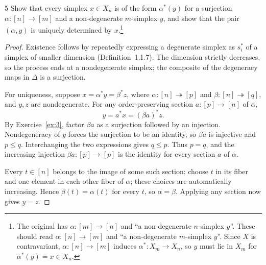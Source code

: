 \begin{exercise}{5}
Show that every simplex $x\in X_n$ is of the form $\alpha^*(y)$ for a
surjection $\alpha\colon[n]\to[m]$ and a non-degenerate $m$-simplex $y$,
and show that the pair $(\alpha,y)$ is uniquely determined by
$x$.\footnote{The original has $\alpha\colon[m]\to[n]$ and
``a non-degenerate $n$-simplex $y$''. These should read
$\alpha\colon[n]\to[m]$ and ``a non-degenerate $m$-simplex $y$''.
Since $X$ is contravariant, $\alpha\colon[n]\to[m]$ induces
$\alpha^*\colon X_m\to X_n$, so $y$ must lie in $X_m$ for
$\alpha^*(y)=x\in X_n$.}

\begin{proof}
Existence follows by repeatedly expressing a degenerate simplex as
$s_i^*$ of a simplex of smaller dimension (Definition~1.1.7).
The dimension strictly decreases, so the process ends at a
nondegenerate simplex; the composite of the degeneracy maps in
$\Delta$ is a surjection.

For uniqueness, suppose $x=\alpha^*y=\beta^*z$, where
$\alpha\colon[n]\twoheadrightarrow[p]$ and
$\beta\colon[n]\twoheadrightarrow[q]$, and $y,z$ are nondegenerate.
For any order-preserving section $a\colon[p]\to[n]$ of $\alpha$,
\[
 y=a^*x=(\beta a)^*z.
\]
By Exercise~\ref{ex:3}, factor $\beta a$ as a surjection followed by
an injection. Nondegeneracy of $y$ forces the surjection to be an
identity, so $\beta a$ is injective and $p\le q$.
Interchanging the two expressions gives $q\le p$. Thus $p=q$, and
the increasing injection $\beta a\colon[p]\to[p]$ is the identity
for every section $a$ of $\alpha$.

Every $t\in[n]$ belongs to the image of some such section: choose
$t$ in its fiber and one element in each other fiber of $\alpha$;
these choices are automatically increasing. Hence
$\beta(t)=\alpha(t)$ for every $t$, so $\alpha=\beta$.
Applying any section now gives $y=z$.
\end{proof}
\end{exercise}
